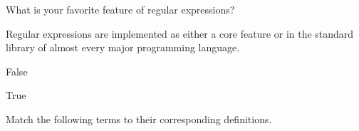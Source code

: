 \documentclass[addpoints]{exam}
\begin{document}
\begin{questions}


\vspace{1cm}

\begin{minipage}{\textwidth}

\question[5]

What is your favorite feature of regular expressions?

\vspace{0.5cm}

\vspace{3cm}

\end{minipage}





\vspace{1cm}

\begin{minipage}{\textwidth}

\question[5]

Regular expressions are implemented as either a core feature or in the standard library of almost every major programming language.

\vspace{0.2cm}

\begin{choices}

\choice

False
\choice

True

\end{choices}

\end{minipage}





\vspace{1cm}

\begin{minipage}{\textwidth}

\question[20]

Match the following terms to their corresponding definitions.


\end{minipage}
\end{questions}
\end{document}
